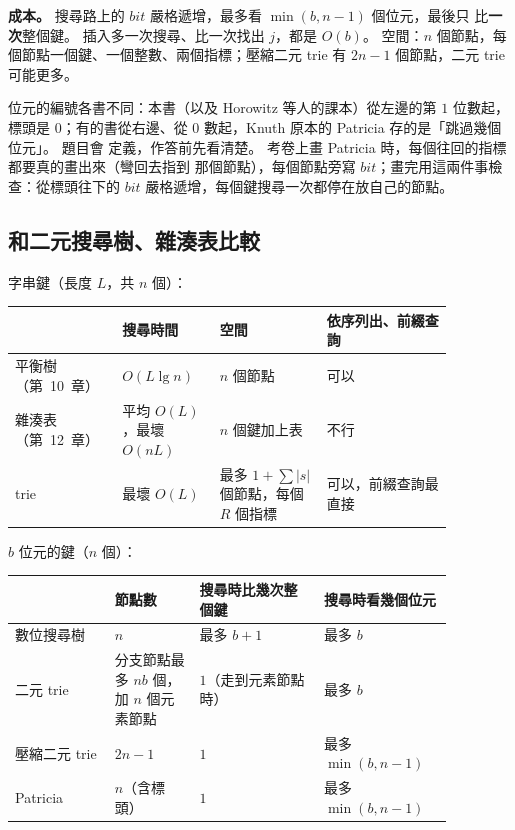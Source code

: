 \textbf{成本。} 搜尋路上的 $\mathit{bit}$ 嚴格遞增，最多看 $\min(b, n - 1)$ 個位元，最後只
比\textbf{一次}整個鍵。 插入多一次搜尋、比一次找出 $j$，都是 $O(b)$。 空間：$n$ 個節點，每
個節點一個鍵、一個整數、兩個指標；壓縮二元 trie 有 $2n - 1$ 個節點，二元 trie 可能更多。

\begin{examnote}
位元的編號各書不同：本書（以及 Horowitz 等人的課本）從左邊的第 $1$ 位數起，標頭是
$0$；有的書從右邊、從 $0$ 數起，Knuth 原本的 Patricia 存的是「跳過幾個位元」。 題目會
定義，作答前先看清楚。 考卷上畫 Patricia 時，每個往回的指標都要真的畫出來（彎回去指到
那個節點），每個節點旁寫 $\mathit{bit}$；畫完用這兩件事檢查：從標頭往下的
$\mathit{bit}$ 嚴格遞增，每個鍵搜尋一次都停在放自己的節點。
\end{examnote}

\subsection{和二元搜尋樹、雜湊表比較}
\label{sec:mw-trie-compare}

字串鍵（長度 $L$，共 $n$ 個）：
\begin{center}
\small
\begin{tabular}{p{0.19\linewidth}p{0.20\linewidth}p{0.22\linewidth}p{0.26\linewidth}}
\toprule
 & 搜尋時間 & 空間 & 依序列出、前綴查詢 \\
\midrule
平衡樹（第~10~章） & $O(L \lg n)$ & $n$ 個節點 & 可以 \\
雜湊表（第~12~章） & 平均 $O(L)$，最壞 $O(nL)$ & $n$ 個鍵加上表 & 不行 \\
trie & 最壞 $O(L)$ & 最多 $1 + \sum |s|$ 個節點，每個 $R$ 個指標 & 可以，前綴查詢最直接 \\
\bottomrule
\end{tabular}
\end{center}

$b$ 位元的鍵（$n$ 個）：
\begin{center}
\small
\begin{tabular}{p{0.20\linewidth}p{0.17\linewidth}p{0.25\linewidth}p{0.25\linewidth}}
\toprule
 & 節點數 & 搜尋時比幾次整個鍵 & 搜尋時看幾個位元 \\
\midrule
數位搜尋樹 & $n$ & 最多 $b + 1$ & 最多 $b$ \\
二元 trie & 分支節點最多 $nb$ 個，加 $n$ 個元素節點 & $1$（走到元素節點時） & 最多 $b$ \\
壓縮二元 trie & $2n - 1$ & $1$ & 最多 $\min(b, n - 1)$ \\
Patricia & $n$（含標頭） & $1$ & 最多 $\min(b, n - 1)$ \\
\bottomrule
\end{tabular}
\end{center}

